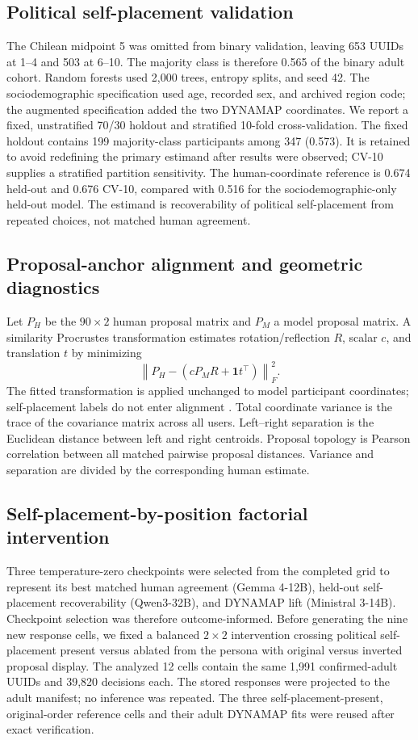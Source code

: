 \documentclass[unnumsec,webpdf,modern,large]{oup-authoring-template}
\begin{document}
\subsection{Political self-placement validation}

The Chilean midpoint 5 was omitted from binary validation, leaving 653 UUIDs at 1--4 and 503 at 6--10. The majority class is therefore 0.565 of the binary adult cohort. Random forests used 2,000 trees, entropy splits, and seed 42. The sociodemographic specification used age, recorded sex, and archived region code; the augmented specification added the two DYNAMAP coordinates. We report a fixed, unstratified 70/30 holdout and stratified 10-fold cross-validation. The fixed holdout contains 199 majority-class participants among 347 (0.573). It is retained to avoid redefining the primary estimand after results were observed; CV-10 supplies a stratified partition sensitivity. The human-coordinate reference is 0.674 held-out and 0.676 CV-10, compared with 0.516 for the sociodemographic-only held-out model. The estimand is recoverability of political self-placement from repeated choices, not matched human agreement.

\subsection{Proposal-anchor alignment and geometric diagnostics}

Let $P_H$ be the $90\times2$ human proposal matrix and $P_M$ a model proposal matrix. A similarity Procrustes transformation estimates rotation/reflection $R$, scalar $c$, and translation $t$ by minimizing
\[
\left\lVert P_H-(cP_MR+\mathbf{1}t^\top)\right\rVert_F^2.
\]
The fitted transformation is applied unchanged to model participant coordinates; self-placement labels do not enter alignment \citep{Schonemann1966}. Total coordinate variance is the trace of the covariance matrix across all users. Left--right separation is the Euclidean distance between left and right centroids. Proposal topology is Pearson correlation between all matched pairwise proposal distances. Variance and separation are divided by the corresponding human estimate.

\subsection{Self-placement-by-position factorial intervention}

Three temperature-zero checkpoints were selected from the completed grid to represent its best matched human agreement (Gemma 4-12B), held-out self-placement recoverability (Qwen3-32B), and DYNAMAP lift (Ministral 3-14B). Checkpoint selection was therefore outcome-informed. Before generating the nine new response cells, we fixed a balanced $2\times2$ intervention crossing political self-placement present versus ablated from the persona with original versus inverted proposal display. The analyzed 12 cells contain the same 1,991 confirmed-adult UUIDs and 39,820 decisions each. The stored responses were projected to the adult manifest; no inference was repeated. The three self-placement-present, original-order reference cells and their adult DYNAMAP fits were reused after exact verification.
\end{document}
